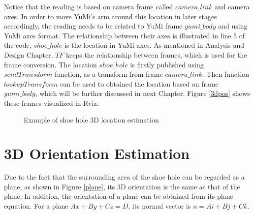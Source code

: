Notice that the reading is based on camera frame called $camera\_link$ and camera axes. In order to move YuMi's arm around this location in later stages accordingly, the reading needs to be related to YuMi frame $yumi\_body$ and using YuMi axes format. The relationship between their axes is illustrated in line 5 of the code, $shoe\_hole$ is the location in YuMi axes. As mentioned in Analysis and Design Chapter, $TF$ keeps the relationship between frames, which is used for the frame conversion. The location $shoe\_hole$ is firstly published using $sendTransdorm$ function, as a transform from frame $camera\_link$. Then function $lookupTransform$ can be used to obtained the location based on frame $yumi\_body$, which will be further discussed in next Chapter. Figure \ref{3dpos} shows these frames visualized in Rviz.

\begin{figure}[H]
\centering
{}
\caption{Example of shoe hole 3D location estimation}
\end{figure}

\section{3D Orientation Estimation}
Due to the fact that the surrounding area of the shoe hole can be regarded as a plane, as shown in Figure \ref{plane}, its 3D orientation is the same as that of the plane. In addition, the orientation of a plane can be obtained from its plane equation. For a plane $Ax + By + Cz = D$, its normal vector is $n = Ai + Bj + Ck$.

